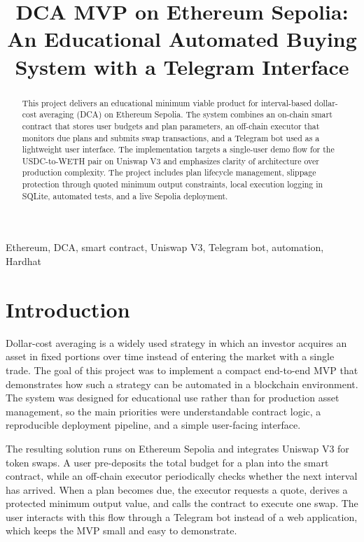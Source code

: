 \documentclass[conference]{IEEEtran}
\title{DCA MVP on Ethereum Sepolia: An Educational Automated Buying System with a Telegram Interface}
\author{
\IEEEauthorblockN{Lyubov Lazareva, Roman Farforov, Ruslan Ziyazetdinov}
\IEEEauthorblockA{Student Project Team\\
Project Repository: \url{https://github.com/ziyazetdinoff/skoltech-blockchain-project}}
}
\begin{document}
\maketitle

\begin{abstract}
This project delivers an educational minimum viable product for interval-based dollar-cost averaging (DCA) on Ethereum Sepolia. The system combines an on-chain smart contract that stores user budgets and plan parameters, an off-chain executor that monitors due plans and submits swap transactions, and a Telegram bot used as a lightweight user interface. The implementation targets a single-user demo flow for the USDC-to-WETH pair on Uniswap V3 and emphasizes clarity of architecture over production complexity. The project includes plan lifecycle management, slippage protection through quoted minimum output constraints, local execution logging in SQLite, automated tests, and a live Sepolia deployment.
\end{abstract}

\begin{IEEEkeywords}
Ethereum, DCA, smart contract, Uniswap V3, Telegram bot, automation, Hardhat
\end{IEEEkeywords}

\section{Introduction}
Dollar-cost averaging is a widely used strategy in which an investor acquires an asset in fixed portions over time instead of entering the market with a single trade. The goal of this project was to implement a compact end-to-end MVP that demonstrates how such a strategy can be automated in a blockchain environment. The system was designed for educational use rather than for production asset management, so the main priorities were understandable contract logic, a reproducible deployment pipeline, and a simple user-facing interface.

The resulting solution runs on Ethereum Sepolia and integrates Uniswap V3 for token swaps. A user pre-deposits the total budget for a plan into the smart contract, while an off-chain executor periodically checks whether the next interval has arrived. When a plan becomes due, the executor requests a quote, derives a protected minimum output value, and calls the contract to execute one swap. The user interacts with this flow through a Telegram bot instead of a web application, which keeps the MVP small and easy to demonstrate.
\end{document}
